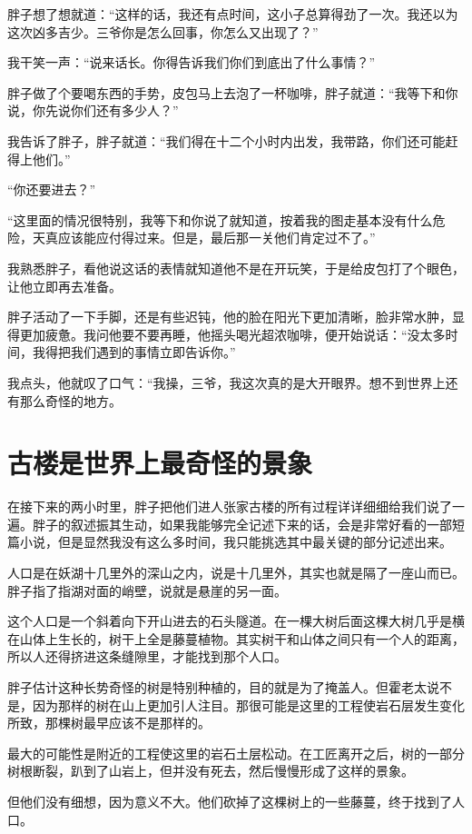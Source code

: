 胖子想了想就道：“这样的话，我还有点时间，这小子总算得劲了一次。我还以为这次凶多吉少。三爷你是怎么回事，你怎么又出现了？”

我干笑一声：“说来话长。你得告诉我们你们到底出了什么事情？”

胖子做了个要喝东西的手势，皮包马上去泡了一杯咖啡，胖子就道：“我等下和你说，你先说你们还有多少人？”

我告诉了胖子，胖子就道：“我们得在十二个小时内出发，我带路，你们还可能赶得上他们。”

“你还要进去？”

“这里面的情况很特别，我等下和你说了就知道，按着我的图走基本没有什么危险，天真应该能应付得过来。但是，最后那一关他们肯定过不了。”

我熟悉胖子，看他说这话的表情就知道他不是在开玩笑，于是给皮包打了个眼色，让他立即再去准备。

胖子活动了一下手脚，还是有些迟钝，他的脸在阳光下更加清晰，脸非常水肿，显得更加疲惫。我问他要不要再睡，他摇头喝光超浓咖啡，便开始说话：“没太多时间，我得把我们遇到的事情立即告诉你。”

我点头，他就叹了口气：“我操，三爷，我这次真的是大开眼界。想不到世界上还有那么奇怪的地方。

\chapter{古楼是世界上最奇怪的景象}

在接下来的两小时里，胖子把他们进人张家古楼的所有过程详详细细给我们说了一遍。胖子的叙述振其生动，如果我能够完全记述下来的话，会是非常好看的一部短篇小说，但是显然我没有这么多时间，我只能挑选其中最关键的部分记述出来。

人口是在妖湖十几里外的深山之内，说是十几里外，其实也就是隔了一座山而已。胖子指了指湖对面的峭壁，说就是悬崖的另一面。

这个人口是一个斜着向下开山进去的石头隧道。在一棵大树后面这棵大树几乎是横在山体上生长的，树干上全是藤蔓植物。其实树干和山体之间只有一个人的距离，所以人还得挤进这条缝隙里，才能找到那个人口。

胖子估计这种长势奇怪的树是特别种植的，目的就是为了掩盖人。但霍老太说不是，因为那样的树在山上更加引人注目。那很可能是这里的工程使岩石层发生变化所致，那棵树最早应该不是那样的。

最大的可能性是附近的工程使这里的岩石土层松动。在工匠离开之后，树的一部分树根断裂，趴到了山岩上，但并没有死去，然后慢慢形成了这样的景象。

但他们没有细想，因为意义不大。他们砍掉了这棵树上的一些藤蔓，终于找到了人口。

